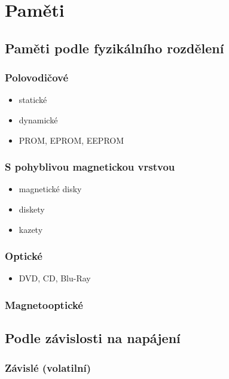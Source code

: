 \documentclass[a4paper,12pt]{article}
\providecommand{\tightlist}{%
\setlength{\itemsep}{0pt}\setlength{\parskip}{0pt}}
\begin{document}
\section{Paměti}

\subsection{Paměti podle fyzikálního rozdělení}

\subsubsection{Polovodičové}

\begin{itemize}
\tightlist
\item statické
\item dynamické
\item PROM, EPROM, EEPROM
\end{itemize}

\subsubsection{S pohyblivou magnetickou vrstvou}

\begin{itemize}
\tightlist
\item magnetické disky
\item diskety
\item kazety
\end{itemize}

\subsubsection{Optické}

\begin{itemize}
\tightlist
\item DVD, CD, Blu-Ray
\end{itemize}

\subsubsection{Magnetooptické}

\subsection{Podle závislosti na napájení}

\subsubsection{Závislé (volatilní)}
\end{document}
